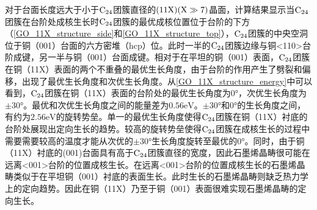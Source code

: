         对于台面长度远大于小于$\rm{C_{24}}$团簇直径的$\rm (11X)(X \gg 7 )$晶面，计算结果显示当$\rm{C_{24}}$团簇在台阶处成核生长时$\rm{C_{24}}$团簇的最优成核位置位于台阶的下方（\ref{GO_11X_structure_side}和\ref{GO_11X_structure_top}），$\rm{C_{24}}$团簇的中央空洞位于铜（001）台面的六方密堆（hcp）位。此时一半的$\rm{C_{24}}$团簇边缘与铜<110>台阶成键，另一半与铜（001）台面成键。相对于在平坦的铜（001）表面，$\rm{C_{24}}$团簇在铜（11X）表面的两个不重叠的最优生长角度，由于台阶的作用产生了劈裂和偏移，出现了最优生长角度和次优生长角度。从\ref{GO_11X_structure_energy}中可以看到，$\rm{C_{24}}$团簇在铜（11X）表面的台阶处的最优生长角度为$0\si{\degree}$，次优生长角度为$\pm 30\si{\degree}$。最优和次优生长角度之间的能量差为$0.56 \si{\electronvolt}$。$\pm 30 \si{\degree}$和$0\si{\degree}$的生长角度之间，有约为$2.56\si{\electronvolt}$的旋转势垒。单一的最优生长角度使得$\rm{C_{24}}$团簇在铜（11X）衬底的台阶处展现出定向生长的趋势。较高的旋转势垒使得$\rm{C_{24}}$团簇在成核生长的过程中需要需要较高的温度才能从次优的$\pm 30 \si{\degree}$生长角度旋转至最优的$0 \si{\degree}$。同时，由于铜（11X）衬底的(001)台面具有高于$\rm{C_{24}}$团簇直径的宽度，因此石墨烯晶畴很可能在远离<001>台阶的位置成核生长。在远离<001>台阶的位置成核生长的石墨烯晶畴类似于在平坦铜（001）衬底的表面生长。此时生长的石墨烯晶畴则缺乏热力学上的定向趋势。因此在铜（11X）乃至于铜（001）表面很难实现石墨烯晶畴的定向生长。

